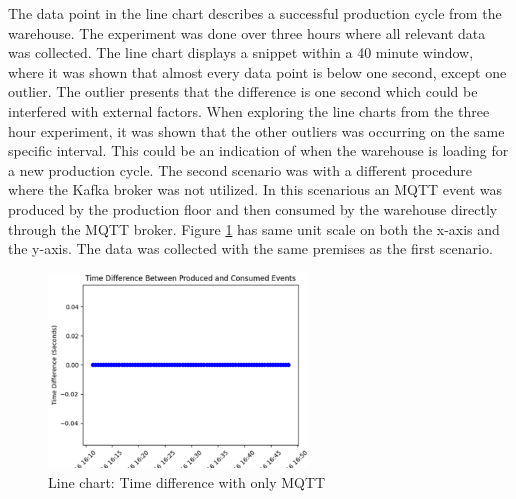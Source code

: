 The data point in the line chart describes a successful production cycle from the warehouse. The experiment was done over three hours where all relevant data was collected. The line chart displays a snippet within a 40 minute window, where it was shown that almost every data point is below one second, except one outlier. The outlier presents that the difference is one second which could be interfered with external factors. When exploring the line charts from the three hour experiment, it was shown that the other outliers was occurring on the same specific interval. This could be an indication of when the warehouse is loading for a new production cycle.
The second scenario was with a different procedure where the Kafka broker was not utilized. In this scenarious an MQTT event was produced by the production floor and then consumed by the warehouse directly through the MQTT broker.
Figure \ref{fig:linechart2} has same unit scale on both the x-axis and the y-axis. The data was collected with the same premises as the first scenario.
\begin{figure}[h]
    \centering
    \includegraphics[width=195pt]{images/linechart2.png}
    \caption{Line chart: Time difference with only MQTT}
    \label{fig:linechart2}
\end{figure}

